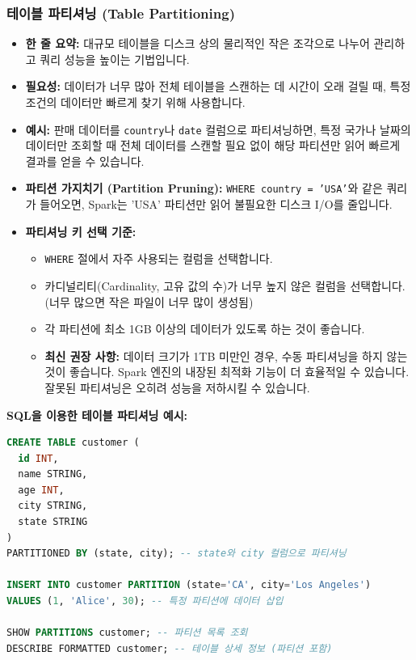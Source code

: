 \documentclass[11pt,a4paper]{article}
\theoremstyle{definition}
\begin{document}
\subsubsection{테이블 파티셔닝 (Table Partitioning)}
\begin{itemize}
    \item \textbf{한 줄 요약:} 대규모 테이블을 디스크 상의 물리적인 작은 조각으로 나누어 관리하고 쿼리 성능을 높이는 기법입니다.
    \item \textbf{필요성:} 데이터가 너무 많아 전체 테이블을 스캔하는 데 시간이 오래 걸릴 때, 특정 조건의 데이터만 빠르게 찾기 위해 사용합니다.
    \item \textbf{예시:} 판매 데이터를 \texttt{country}나 \texttt{date} 컬럼으로 파티셔닝하면, 특정 국가나 날짜의 데이터만 조회할 때 전체 데이터를 스캔할 필요 없이 해당 파티션만 읽어 빠르게 결과를 얻을 수 있습니다.
    \item \textbf{파티션 가지치기 (Partition Pruning):} \texttt{WHERE country = 'USA'}와 같은 쿼리가 들어오면, Spark는 'USA' 파티션만 읽어 불필요한 디스크 I/O를 줄입니다.
    \item \textbf{파티셔닝 키 선택 기준:}
    \begin{itemize}
        \item \texttt{WHERE} 절에서 자주 사용되는 컬럼을 선택합니다.
        \item 카디널리티(Cardinality, 고유 값의 수)가 너무 높지 않은 컬럼을 선택합니다. (너무 많으면 작은 파일이 너무 많이 생성됨)
        \item 각 파티션에 최소 1GB 이상의 데이터가 있도록 하는 것이 좋습니다.
        \item \textbf{최신 권장 사항:} 데이터 크기가 1TB 미만인 경우, 수동 파티셔닝을 하지 않는 것이 좋습니다. Spark 엔진의 내장된 최적화 기능이 더 효율적일 수 있습니다. 잘못된 파티셔닝은 오히려 성능을 저하시킬 수 있습니다.
    \end{itemize}
\end{itemize}

\begin{examplebox}
\textbf{SQL을 이용한 테이블 파티셔닝 예시:}
\begin{lstlisting}[language=SQL, caption=테이블 파티셔닝 정의, label=lst:partition_ddl]
CREATE TABLE customer (
  id INT,
  name STRING,
  age INT,
  city STRING,
  state STRING
)
PARTITIONED BY (state, city); -- state와 city 컬럼으로 파티셔닝

INSERT INTO customer PARTITION (state='CA', city='Los Angeles')
VALUES (1, 'Alice', 30); -- 특정 파티션에 데이터 삽입

SHOW PARTITIONS customer; -- 파티션 목록 조회
DESCRIBE FORMATTED customer; -- 테이블 상세 정보 (파티션 포함)
\end{lstlisting}
\end{examplebox}
\end{document}
